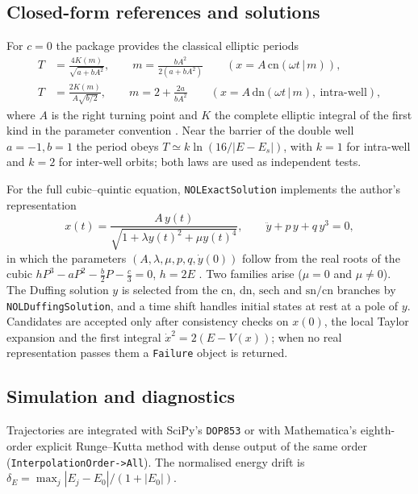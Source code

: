 \documentclass[11pt]{article}
\begin{document}
\subsection{Closed-form references and solutions}
For $c=0$ the package provides the classical elliptic periods
\begin{align}
T&=\frac{4K(m)}{\sqrt{a+bA^2}},\qquad m=\frac{bA^2}{2(a+bA^2)}\qquad (x=A\,\mathrm{cn}(\omega t\,|\,m)),\\
T&=\frac{2K(m)}{A\sqrt{b/2}},\qquad m=2+\frac{2a}{bA^2}\qquad (x=A\,\mathrm{dn}(\omega t\,|\,m),\ \text{intra-well}),
\end{align}
where $A$ is the right turning point and $K$ the complete elliptic integral of the first kind in the parameter convention \cite{byrd,dlmf}. Near the barrier of the double well $a=-1,b=1$ the period obeys $T\simeq k\ln(16/|E-E_s|)$, with $k=1$ for intra-well and $k=2$ for inter-well orbits; both laws are used as independent tests.

For the full cubic--quintic equation, \texttt{NOLExactSolution} implements the author's representation
\begin{equation}x(t)=\frac{A\,y(t)}{\sqrt{1+\lambda y(t)^2+\mu y(t)^4}},\qquad \ddot y+p\,y+q\,y^3=0,\label{eq:cq}\end{equation}
in which the parameters $(A,\lambda,\mu,p,q,\dot y(0))$ follow from the real roots of the cubic $hP^3-aP^2-\tfrac b2P-\tfrac c3=0$, $h=2E$ \cite{salascq}. Two families arise ($\mu=0$ and $\mu\neq0$). The Duffing solution $y$ is selected from the $\mathrm{cn}$, $\mathrm{dn}$, $\mathrm{sech}$ and $\mathrm{sn}/\mathrm{cn}$ branches by \texttt{NOLDuffingSolution}, and a time shift handles initial states at rest at a pole of $y$. Candidates are accepted only after consistency checks on $x(0)$, the local Taylor expansion and the first integral $\dot x^2=2(E-V(x))$; when no real representation passes them a \texttt{Failure} object is returned.

\subsection{Simulation and diagnostics}
Trajectories are integrated with SciPy's \texttt{DOP853} \cite{scipy,hairer} or with Mathematica's \cite{wolfram} eighth-order explicit Runge--Kutta method with dense output of the same order (\texttt{InterpolationOrder->All}). The normalised energy drift is $\delta_E=\max_j|E_j-E_0|/(1+|E_0|)$.
\end{document}
